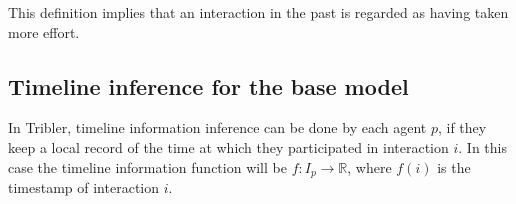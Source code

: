 \documentclass[a4paper,11pt]{book}
\newcommand{\bb}{\mathbb}
\theoremstyle{definition}
\begin{document}
This definition implies that an interaction in the past is regarded as having taken more effort.

\subsection{Timeline inference for the base model}


In Tribler, timeline information inference can be done by each agent $p$, if they
keep a local record of the time at which they participated in interaction $i$. In this
case the timeline information function will be $f : I_p \to \bb{R}$, where $f(i)$ is
the timestamp of interaction $i$.





{}

\end{document}
